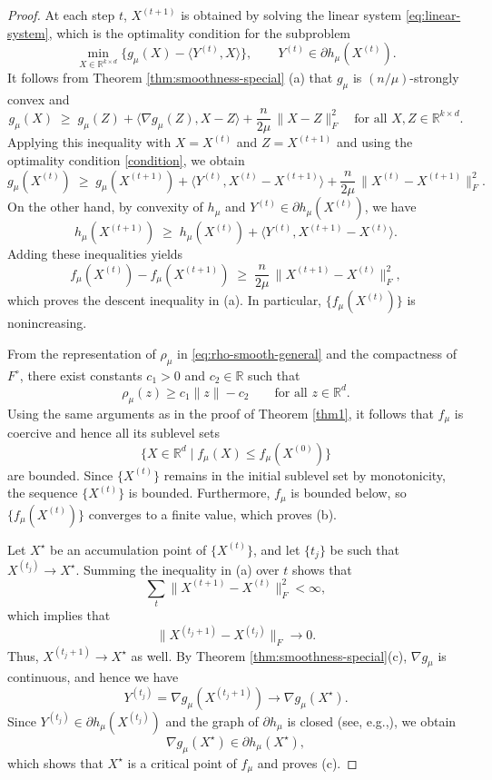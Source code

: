 \documentclass[11pt]{article}
\theoremstyle{definition}
\newcommand{\R}{\mathbb{R}}
\newcommand{\1}{\mathbf{1}}
\begin{document}
\begin{proof}
At each step $t$, $X^{(t+1)}$ is obtained by solving the linear system \eqref{eq:linear-system},
which is the optimality condition for the subproblem
\[
\min_{X\in\R^{k\times d}} \{ g_\mu(X) - \langle Y^{(t)}, X \rangle \},
\qquad Y^{(t)} \in \partial h_\mu(X^{(t)}).
\]
It follows from Theorem \ref{thm:smoothness-special} (a) that $g_\mu$ is $(n/\mu)$-strongly convex
and
\[
g_\mu(X) \;\ge\; g_\mu(Z)
+ \langle \nabla g_\mu(Z), X-Z \rangle
+ \frac{n}{2\mu}\,\|X-Z\|_F^2
\quad\text{for all }X,Z\in\R^{k\times d}.
\]
Applying this inequality with $X=X^{(t)}$ and $Z=X^{(t+1)}$ and using the optimality condition
\eqref{condition}, we obtain
\[
g_\mu(X^{(t)}) \;\ge\;
g_\mu(X^{(t+1)}) + \langle Y^{(t)}, X^{(t)} - X^{(t+1)} \rangle
+ \frac{n}{2\mu}\,\|X^{(t)} - X^{(t+1)}\|_F^2.
\]
On the other hand, by convexity of $h_\mu$ and $Y^{(t)} \in \partial h_\mu(X^{(t)})$, we have
\[
h_\mu(X^{(t+1)}) \;\ge\;
h_\mu(X^{(t)}) + \langle Y^{(t)}, X^{(t+1)} - X^{(t)} \rangle.
\]
Adding these inequalities yields
\[
f_\mu(X^{(t)}) - f_\mu(X^{(t+1)})
\;\ge\;
\frac{n}{2\mu}\,\|X^{(t+1)} - X^{(t)}\|_F^2,
\]
which proves the descent inequality in (a). In particular, $\{f_\mu(X^{(t)})\}$ is nonincreasing.


From the representation of $\rho_\mu$ in \eqref{eq:rho-smooth-general} and the compactness of $F^\circ$,
there exist constants $c_1>0$ and $c_2\in\mathbb{R}$ such that
\[
\rho_\mu(z)\ge c_1\|z\|-c_2
\qquad \text{for all } z\in\mathbb{R}^d.
\]
Using the same arguments as in the proof of Theorem \ref{thm1}, it follows that $f_\mu$ is coercive and hence all its sublevel sets
$$\{X\in \R^d \mid f_\mu(X) \le f_\mu(X^{(0)})\}$$ are bounded. Since $\{X^{(t)}\}$ remains in the initial
sublevel set by monotonicity, the sequence $\{X^{(t)}\}$ is bounded. Furthermore, $f_\mu$ is
bounded below, so $\{f_\mu(X^{(t)})\}$ converges to a finite value, which proves (b).

Let $X^\star$ be an accumulation point of $\{X^{(t)}\}$, and let $\{t_j\}$ be such that
$X^{(t_j)} \to X^\star$. Summing the inequality in (a) over $t$ shows that
$$\sum_t \|X^{(t+1)} - X^{(t)}\|_F^2 < \infty,$$ 
which implies that
$$\|X^{(t_j+1)} - X^{(t_j)}\|_F \to 0.$$ 
Thus, $X^{(t_j+1)} \to X^\star$ as well.
By Theorem \ref{thm:smoothness-special}(c), $\nabla g_\mu$ is continuous, and hence we have
\[
Y^{(t_j)} = \nabla g_\mu(X^{(t_j+1)}) \longrightarrow \nabla g_\mu(X^\star).
\]
Since $Y^{(t_j)} \in \partial h_\mu(X^{(t_j)})$ and the graph of $\partial h_\mu$ is closed (see, e.g.,\cite[Theorem 24.4]{rockafellar1970convex}),
we obtain
\[
\nabla g_\mu(X^\star) \in \partial h_\mu(X^\star),
\]
which shows that $X^\star$ is a critical point of $f_\mu$ and proves (c).
\end{proof}
\end{document}
